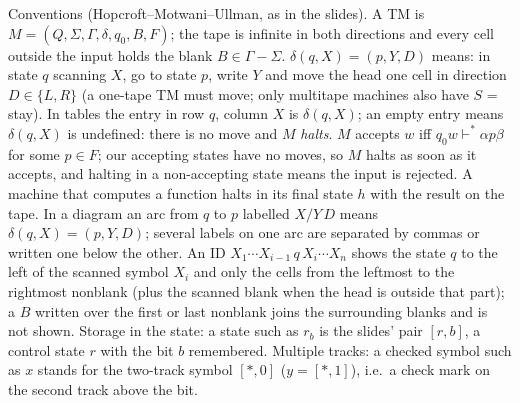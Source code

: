 \documentclass[11pt,a4paper]{article}
\begin{document}
\begin{note}Conventions (Hopcroft--Motwani--Ullman, as in the slides). A TM is $M=(Q,\Sigma,\Gamma,\delta,q_0,B,F)$; the tape is infinite in both directions and every cell outside the input holds the blank $B\in\Gamma-\Sigma$. $\delta(q,X)=(p,Y,D)$ means: in state $q$ scanning $X$, go to state $p$, write $Y$ and move the head one cell in direction $D\in\{L,R\}$ (a one-tape TM must move; only multitape machines also have $S$ = stay). In tables the entry in row $q$, column $X$ is $\delta(q,X)$; an empty entry means $\delta(q,X)$ is undefined: there is no move and $M$ \emph{halts}. $M$ accepts $w$ iff $q_0w\vdash^*\alpha p\beta$ for some $p\in F$; our accepting states have no moves, so $M$ halts as soon as it accepts, and halting in a non-accepting state means the input is rejected. A machine that computes a function halts in its final state $h$ with the result on the tape. In a diagram an arc from $q$ to $p$ labelled $X/Y\,D$ means $\delta(q,X)=(p,Y,D)$; several labels on one arc are separated by commas or written one below the other. An ID $X_1\cdots X_{i-1}\,q\,X_i\cdots X_n$ shows the state $q$ to the left of the scanned symbol $X_i$ and only the cells from the leftmost to the rightmost nonblank (plus the scanned blank when the head is outside that part); a $B$ written over the first or last nonblank joins the surrounding blanks and is not shown. Storage in the state: a state such as $r_b$ is the slides' pair $[r,b]$, a control state $r$ with the bit $b$ remembered. Multiple tracks: a checked symbol such as $x$ stands for the two-track symbol $[\ast,0]$ ($y=[\ast,1]$), i.e.\ a check mark on the second track above the bit.\end{note}
\end{document}
